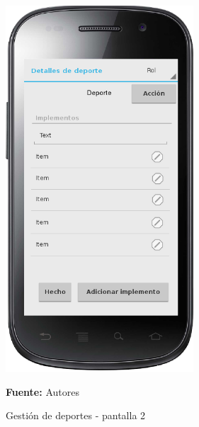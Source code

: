 \begin{figure}[!htb]
  \begin{center}
    \includegraphics[width=7cm]{./imagenes/UI/Deportes/gestion_deportes_2.png}
    \caption{Gestión de deportes - pantalla 2}
    \label{fig:gestion_deportes_2}
    \textbf{Fuente:}  Autores
  \end{center}
\end{figure}

